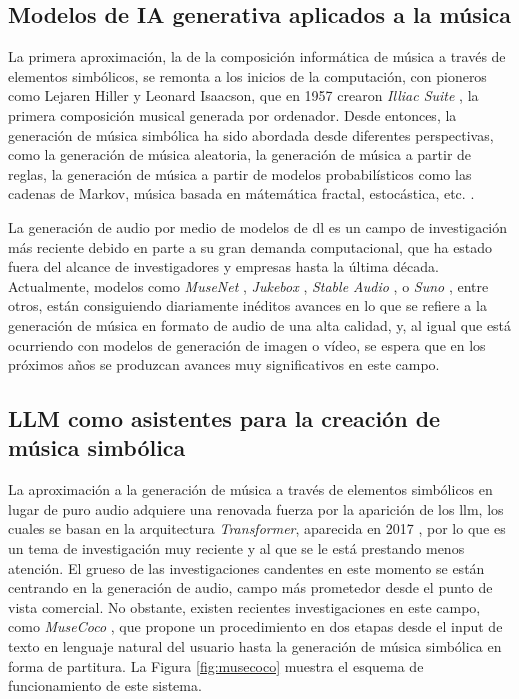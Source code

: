 \subsection{Modelos de IA generativa aplicados a la música}

La primera aproximación, la de la composición informática de música a través de elementos simbólicos, se remonta a los inicios de la computación, con pioneros como Lejaren Hiller y Leonard Isaacson, que en 1957 crearon \emph{Illiac Suite} \citep{arizaTwoPioneeringProjects2011,funkMusicalSuiteComposed2018a}, la primera composición musical generada por ordenador. Desde entonces, la generación de música simbólica ha sido abordada desde diferentes perspectivas, como la generación de música aleatoria, la generación de música a partir de reglas, la generación de música a partir de modelos probabilísticos como las cadenas de Markov, música basada en mátemática fractal, estocástica, etc. \citep{hernandez-olivanSurveyArtificialIntelligence2022}. 

La generación de audio por medio de modelos de \gls{dl} es un campo de investigación más reciente debido en parte a su gran demanda computacional, que ha estado fuera del alcance de investigadores y empresas hasta la última década. Actualmente, modelos como \emph{MuseNet}  \citep{departmentofcomputersciencesrminstituteofscienceandtechnologychennaiindia.MusenetMusicGeneration2020a}, \emph{Jukebox} \citep{dhariwalJukeboxGenerativeModel2020}, \emph{Stable Audio} \cite{StableAudioFast}, o \emph{Suno} \citep{SunoAI}, entre otros, están consiguiendo diariamente inéditos avances en lo que se refiere a la generación de música en formato de audio de una alta calidad, y, al igual que está ocurriendo con modelos de generación de imagen o vídeo, se espera que en los próximos años se produzcan avances muy significativos en este campo.


\subsection{LLM como asistentes para la creación de música simbólica}
\label{sec:llm_asistentes_creacion_codigo_programacion}

La aproximación a la generación de música a través de elementos simbólicos en lugar de puro audio adquiere una renovada fuerza por la aparición de los \gls{llm}, los cuales se basan en la arquitectura \emph{Transformer}, aparecida en 2017 \citep{vaswaniAttentionAllYou2017}, por lo que es un tema de investigación muy reciente y al que se le está prestando menos atención. El grueso de las investigaciones candentes en este momento se están centrando en la generación de audio, campo más prometedor desde el punto de vista comercial. No obstante, existen recientes investigaciones en este campo, como \emph{MuseCoco} \citep{luMuseCocoGeneratingSymbolic2023}, que propone un procedimiento en dos etapas desde el input de texto en lenguaje natural del usuario hasta la generación de música simbólica en forma de partitura. La Figura \ref{fig:musecoco} muestra el esquema de funcionamiento de este sistema. 

